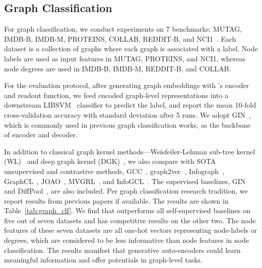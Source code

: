 \subsection{Graph Classification}


For graph classification,  we conduct experiments on 7 benchmarks: MUTAG, IMDB-B, IMDB-M, PROTEINS, COLLAB, REDDIT-B, and NCI1~\cite{yanardag2015deep}.
Each dataset is a collection of graphs where each graph is associated with a label.
Node labels are used as input features in MUTAG, PROTEINS, and NCI1, whereas node degrees are used in IMDB-B, IMDB-M, REDDIT-B, and COLLAB.

For the evaluation protocol, after generating graph embeddings with \model's encoder and readout function, we feed encoded graph-level representations into a downstream LIBSVM~\cite{chang2011libsvm} classifier to predict the label, and report the mean 10-fold cross-validation accuracy with standard deviation after 5 runs.  We adopt GIN~\cite{xu2019powerful}, which is commonly used in previous graph classification works, as the backbone of encoder and decoder.

In addition to classical graph kernel methods---Weisfeiler-Lehman sub-tree kernel (WL)~\cite{shervashidze2011weisfeiler} and deep graph kernel (DGK)~\cite{yanardag2015deep}, we also compare \model with SOTA unsupervised and contrastive methods, 
GCC~\cite{qiu2020gcc}, graph2vec~\cite{narayanan2017graph2vec}, Infograph~\cite{sun2019infograph}, GraphCL~\cite{you2020graph}, JOAO~\cite{you2021graph},  MVGRL~\cite{hassani2020contrastive}, and InfoGCL~\cite{Xu2021InfoGCLIG}. 
The supervised baselines, GIN~\cite{xu2019powerful} and DiffPool~\cite{ying2018hierarchical}, are also included. 
Per graph classification research tradition, we report results from previous papers if available.
The results are shown in Table~\ref{tab:graph_clf}.
We find that \model outperforms all self-supervised baselines on five out of seven datasets and has competitive results on the other two.
The node features of these seven datasets are all one-hot vectors representing node-labels or degrees, which are considered to be less informative than node features in node classification. The results manifest that generative auto-encoders could learn meaningful information and offer potentials in graph-level tasks.









